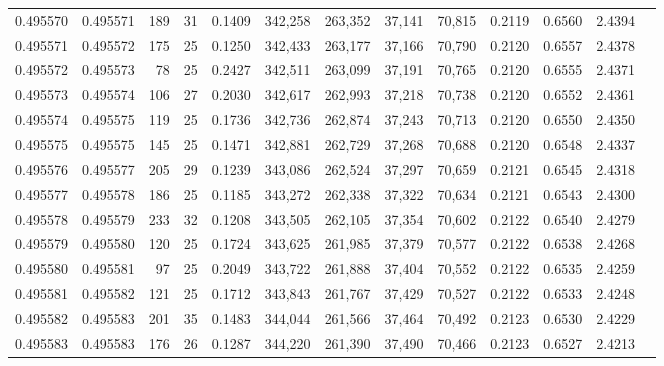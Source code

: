 \begin{tabular}{rrrrrrrrrrrrr}
0.495570 & 0.495571 & 189 &  31 &                                     0.1409 & 342,258 & 263,352 &  37,141 &  70,815 & 0.2119 & 0.6560 & 2.4394 \\
0.495571 & 0.495572 & 175 &  25 &                                     0.1250 & 342,433 & 263,177 &  37,166 &  70,790 & 0.2120 & 0.6557 & 2.4378 \\
0.495572 & 0.495573 &  78 &  25 &                                     0.2427 & 342,511 & 263,099 &  37,191 &  70,765 & 0.2120 & 0.6555 & 2.4371 \\
0.495573 & 0.495574 & 106 &  27 &                                     0.2030 & 342,617 & 262,993 &  37,218 &  70,738 & 0.2120 & 0.6552 & 2.4361 \\
0.495574 & 0.495575 & 119 &  25 &                                     0.1736 & 342,736 & 262,874 &  37,243 &  70,713 & 0.2120 & 0.6550 & 2.4350 \\
0.495575 & 0.495575 & 145 &  25 &                                     0.1471 & 342,881 & 262,729 &  37,268 &  70,688 & 0.2120 & 0.6548 & 2.4337 \\
0.495576 & 0.495577 & 205 &  29 &                                     0.1239 & 343,086 & 262,524 &  37,297 &  70,659 & 0.2121 & 0.6545 & 2.4318 \\
0.495577 & 0.495578 & 186 &  25 &                                     0.1185 & 343,272 & 262,338 &  37,322 &  70,634 & 0.2121 & 0.6543 & 2.4300 \\
0.495578 & 0.495579 & 233 &  32 &                                     0.1208 & 343,505 & 262,105 &  37,354 &  70,602 & 0.2122 & 0.6540 & 2.4279 \\
0.495579 & 0.495580 & 120 &  25 &                                     0.1724 & 343,625 & 261,985 &  37,379 &  70,577 & 0.2122 & 0.6538 & 2.4268 \\
0.495580 & 0.495581 &  97 &  25 &                                     0.2049 & 343,722 & 261,888 &  37,404 &  70,552 & 0.2122 & 0.6535 & 2.4259 \\
0.495581 & 0.495582 & 121 &  25 &                                     0.1712 & 343,843 & 261,767 &  37,429 &  70,527 & 0.2122 & 0.6533 & 2.4248 \\
0.495582 & 0.495583 & 201 &  35 &                                     0.1483 & 344,044 & 261,566 &  37,464 &  70,492 & 0.2123 & 0.6530 & 2.4229 \\
0.495583 & 0.495583 & 176 &  26 &                                     0.1287 & 344,220 & 261,390 &  37,490 &  70,466 & 0.2123 & 0.6527 & 2.4213 \\

\end{tabular}
